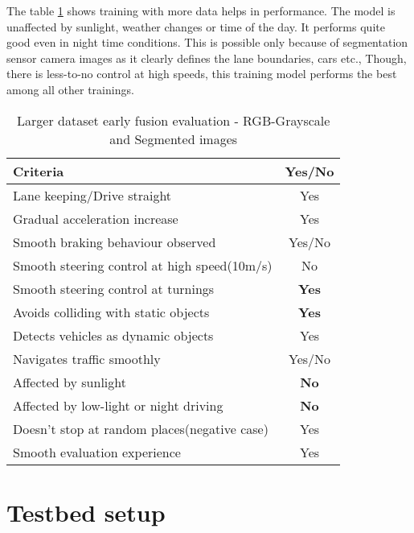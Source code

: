 The table \ref{table:earlyfusionrgbseg200k} shows training with more data helps in
performance. The model is unaffected by sunlight, weather changes or time of the day. It
performs quite good even in night time conditions. This is possible only because of
segmentation sensor camera images as it clearly defines the lane boundaries, cars etc.,
Though, there is less-to-no control at high speeds, this training model performs the best
among all other trainings.
\begin{table}[t]
    \centering
\begin{tabular}{lc}
    \toprule
    Criteria  & Yes/No \\\midrule
    Lane keeping/Drive straight  & Yes  \\
    Gradual acceleration increase  & Yes\\
    Smooth braking behaviour observed & Yes/No \\
    Smooth steering control at high speed(10m/s) & No \\
    Smooth steering control at turnings & \textbf{Yes}\\
    Avoids colliding with static objects & \textbf{Yes} \\
    Detects vehicles as dynamic objects & Yes \\
    Navigates traffic smoothly & Yes/No\\
    Affected by sunlight & \textbf{No} \\
    Affected by low-light or night driving & \textbf{No} \\
    Doesn't stop at random places(negative case) & Yes \\
    Smooth evaluation experience & Yes \\\bottomrule
\end{tabular}
\caption{Larger dataset early fusion evaluation - RGB-Grayscale and Segmented images}
\label{table:earlyfusionrgbseg200k}
\end{table}


\iffalse
\section{Testbed setup}

